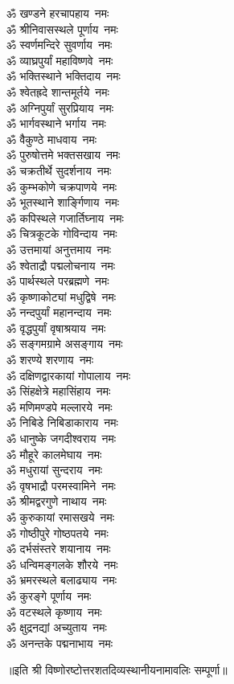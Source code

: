 \begin{multicols}{2}
\begin{flushleft}
ॐ खण्डने हरचापहाय~नमः\\
ॐ श्रीनिवासस्थले पूर्णाय~नमः\\
ॐ स्वर्णमन्दिरे सुवर्णाय~नमः\\
ॐ व्याघ्रपुर्यां महाविष्णवे~नमः\\
ॐ भक्तिस्थाने भक्तिदाय~नमः\\
ॐ श्वेतह्रदे शान्तमूर्तये~नमः\\
ॐ अग्निपुर्यां सुरप्रियाय~नमः\\
ॐ भार्गवस्थाने भर्गाय~नमः\\
ॐ वैकुण्ठे माधवाय~नमः\hfill{}\\
ॐ पुरुषोत्तमे भक्तसखाय~नमः\\
ॐ चक्रतीर्थे सुदर्शनाय~नमः\\
ॐ कुम्भकोणे चक्रपाणये~नमः\\
ॐ भूतस्थाने शार्ङ्गिणाय~नमः\\
ॐ कपिस्थले गजार्तिघ्नाय~नमः\\
ॐ चित्रकूटके गोविन्दाय~नमः\\
ॐ उत्तमायां अनुत्तमाय~नमः\\
ॐ श्वेताद्रौ पद्मलोचनाय~नमः\\
ॐ पार्थस्थले परब्रह्मणे~नमः\\
ॐ कृष्णाकोट्यां मधुद्विषे~नमः\hfill{}\\
ॐ नन्दपुर्यां महानन्दाय~नमः\\
ॐ वृद्धपुर्यां वृषाश्रयाय~नमः\\
ॐ सङ्गमग्रामे असङ्गाय~नमः\\
ॐ शरण्ये शरणाय~नमः\\
ॐ दक्षिणद्वारकायां गोपालाय~नमः\\
ॐ सिंहक्षेत्रे महासिंहाय~नमः\\
ॐ मणिमण्डपे मल्लारये~नमः\\
ॐ निबिडे निबिडाकाराय~नमः\\
ॐ धानुष्के जगदीश्वराय~नमः\\
ॐ मौहूरे कालमेघाय~नमः\hfill{}\\
ॐ मधुरायां सुन्दराय~नमः\\
ॐ वृषभाद्रौ परमस्वामिने~नमः\\
ॐ श्रीमद्वरगुणे नाथाय~नमः\\
ॐ कुरुकायां रमासखये~नमः\\
ॐ गोष्ठीपुरे गोष्ठपतये~नमः\\
ॐ दर्भसंस्तरे शयानाय~नमः\\
ॐ धन्विमङ्गलके शौरये~नमः\\
ॐ भ्रमरस्थले बलाढ्याय~नमः\\
ॐ कुरङ्गे पूर्णाय~नमः\\
ॐ वटस्थले कृष्णाय~नमः\hfill{}\\
ॐ क्षुद्रनद्यां अच्युताय~नमः\\
ॐ अनन्तके पद्मनाभाय~नमः\\
\end{flushleft}
\end{multicols}
॥इति श्री विष्णोरष्टोत्तरशतदिव्यस्थानीयनामावलिः सम्पूर्णा॥
